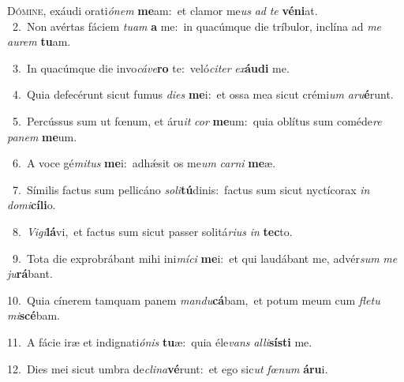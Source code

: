 \lettrine{\initial\textcolor{\initialcolor}{D}}{ómine,} exáudi orati\-\textit{ó}\-\textit{nem} \textbf{me}\-am:~\star et clamor me\textit{us} \textit{ad} \textit{te} \textbf{vé}\-\textbf{ni}at.\\
{\numbfont\textcolor{\numbcolor}{~2.}}~Non avértas fáciem \textit{tu}\-\textit{am} \textbf{a} me:~\star in quacúmque die tríbulor, inclína ad \textit{me} \textit{au}\-\textit{rem} \textbf{tu}\-am.\par
{\numbfont\textcolor{\numbcolor}{~3.}}~In quacúmque die invo\-\textit{cá}\-\textit{ve}\textbf{ro} te:~\star veló\-\textit{ci}\-\textit{ter} \textit{ex}\-\textbf{áu}\textbf{di} me.\par
{\numbfont\textcolor{\numbcolor}{~4.}}~Quia defecérunt sicut fumus \textit{di}\-\textit{es} \textbf{me}\-i:~\star et ossa mea sicut crémi\textit{um} \textit{a}\-\textit{ru}\textbf{é}runt.\par
{\numbfont\textcolor{\numbcolor}{~5.}}~Percússus sum ut fœnum, et áru\textit{it} \textit{cor} \textbf{me}\-um:~\star quia oblítus sum coméde\textit{re} \textit{pa}\-\textit{nem} \textbf{me}\-um.\par
{\numbfont\textcolor{\numbcolor}{~6.}}~A voce gé\-\textit{mi}\-\textit{tus} \textbf{me}\-i:~\star adhǽsit os me\textit{um} \textit{car}\-\textit{ni} \textbf{me}\-æ.\par
{\numbfont\textcolor{\numbcolor}{~7.}}~Símilis factus sum pellicáno \textit{so}\-\textit{li}\textbf{tú}dinis:~\star factus sum sicut nyctícorax \textit{in} \textit{do}\-\textit{mi}\textbf{cí}\textbf{li}o.\par
{\numbfont\textcolor{\numbcolor}{~8.}}~\-\textit{Vi}\-\textit{gi}\textbf{lá}vi,~\star et factus sum sicut passer solitá\-\textit{ri}\-\textit{us} \textit{in} \textbf{tec}\-to.\par
{\numbfont\textcolor{\numbcolor}{~9.}}~Tota die exprobrábant mihi ini\-\textit{mí}\-\textit{ci} \textbf{me}\-i:~\star et qui laudábant me, advér\textit{sum} \textit{me} \textit{ju}\-\textbf{rá}bant.\par
{\numbfont\textcolor{\numbcolor}{10.}}~Quia cínerem tamquam panem \textit{man}\-\textit{du}\textbf{cá}bam,~\star et potum meum cum \textit{fle}\-\textit{tu} \textit{mi}\-\textbf{scé}bam.\par
{\numbfont\textcolor{\numbcolor}{11.}}~A fácie iræ et indignati\-\textit{ó}\-\textit{nis} \textbf{tu}\-æ:~\star quia éle\textit{vans} \textit{al}\-\textit{li}\textbf{sís}\textbf{ti} me.\par
{\numbfont\textcolor{\numbcolor}{12.}}~Dies mei sicut umbra de\-\textit{cli}\-\textit{na}\textbf{vé}runt:~\star et ego sic\textit{ut} \textit{fœ}\-\textit{num} \textbf{á}\-\textbf{ru}i.\par
